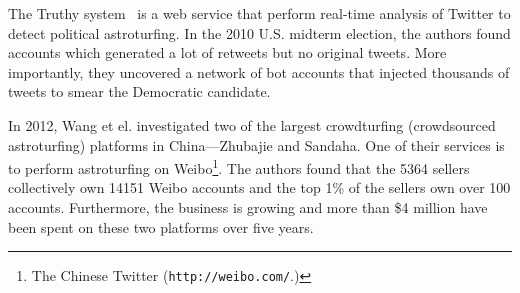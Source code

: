 The Truthy system~\cite{ratkiewicz2011truthy} is a web service that perform
real-time analysis of Twitter to detect political astroturfing. In the 2010
U.S. midterm election, the authors found accounts which generated a lot of
retweets but no original tweets. More importantly, they uncovered a network of
bot accounts that injected thousands of tweets to smear the Democratic candidate.

In 2012, Wang et el. investigated two of the largest crowdturfing (crowdsourced
astroturfing) platforms in China---Zhubajie and Sandaha. One of their services
is to perform astroturfing on Weibo\footnote{The Chinese Twitter
  (\texttt{http://weibo.com/}.)}. The authors found that the 5364 sellers
collectively own 14151 Weibo accounts and the top 1\% of the sellers own over
100 accounts. Furthermore, the business is growing and more than \$4 million
have been spent on these two platforms over five years\cite{wang2012serf}.

